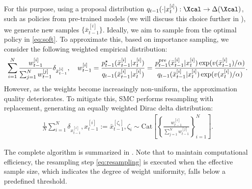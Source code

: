 For this purpose, using a proposal distribution $q_{t-1}(\cdot | x^{[i]}_{t}):\Xcal \to \Delta(\Xcal)$, such as policies from pre-trained models (we will discuss this choice further in ), we generate new samples $\{\bar x^{[i]}_{t-1}\}$. Ideally, we aim to sample from the optimal policy in \eqref{eq:soft}. To approximate this, based on importance sampling, we consider the following weighted empirical distribution:
\begin{align*}
     \sum_{i=1}^N \frac{w^{[i]}_{t-1}  }{\sum_{j=1}^N w^{[j]}_{t-1}}\delta_{ \bar x^{[i]}_{t-1}}, \quad w^{[i]}_{t-1} = \frac{p^{\star}_{t-1}(\bar x^{[i]}_{t-1}|x^{[i]}_{t} )  }{q_{t-1}( \bar x^{[i]}_{t-1}|x^{[i]}_{t} ) } = \frac{ p^{\mathrm{pre}}_{t-1}(\bar x^{[i]}_{t-1}|x^{[i]}_{t} )\exp(v(\bar x^{[i]}_{t-1})/\alpha) }{q_{t-1}(\bar x^{[i]}_{t-1}|x^{[i]}_{t} ) \exp(v(x^{[i]}_{t})/\alpha )   }. 
\end{align*}
However, as the weights become increasingly non-uniform, the approximation quality deteriorates. To mitigate this, SMC performs resampling with replacement, generating an equally weighted Dirac delta distribution: 
\begin{align}\label{eq:resampling}
    \frac{1}{N} \sum_{i=1}^N \delta_{x^{[i]}_{t-1}}, x^{[i]}_{t-1}:= \bar x^{[\zeta_i]}_{t-1}, \zeta_i \sim \mathrm{Cat}\left [\left\{   \frac{w^{[i]}_{t-1}  }{\sum_{j=1}^N w^{[j]}_{t-1}} \right\}_{i=1}^N \right ]. 
\end{align}

The complete algorithm is summarized in . Note that to maintain computational efficiency, the resampling step \eqref{eq:resampling} is executed when the effective sample size, which indicates the degree of weight uniformity, falls below a predefined threshold.


